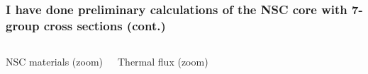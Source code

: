 \documentclass[compress,10pt]{beamer}
\begin{document}
\begin{frame}
    \frametitle{I have done preliminary calculations of the NSC core with 7-group cross sections (cont.)}

    \centering
    \begin{columns}[c]


        \centering
        {\small NSC materials (zoom)}


        \centering
        {\small Thermal flux (zoom)}

    \end{columns}

    \begin{columns}[c]


        \centering


        \centering

    \end{columns}

\end{frame}


\typeout{***********************************************************************************}
\end{document}
